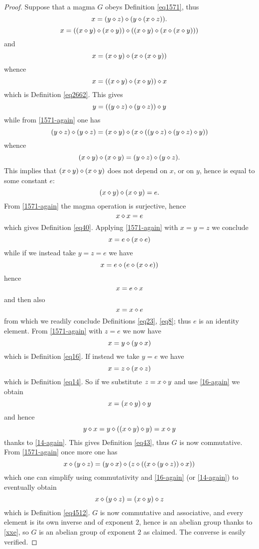 \begin{proof}\leanok  Suppose that a magma $G$ obeys Definition \ref{eq1571}, thus
\begin{equation}\label{1571-again}
 x = (y \diamond z) \diamond (y \diamond (x \diamond z)).
\end{equation}
$$ x = ((x \diamond y) \diamond (x \diamond y)) \diamond ((x \diamond y) \diamond (x \diamond (x \diamond y)))$$
and
$$ x = (x \diamond y) \diamond (x \diamond (x \diamond y))$$
whence
$$x = ((x \diamond y) \diamond (x \diamond y)) \diamond x$$
which is Definition \ref{eq2662}.  This gives
$$y = ((y \diamond z) \diamond (y \diamond z)) \diamond y$$
while from \eqref{1571-again} one has
$$ (y \diamond z) \diamond (y \diamond z) = (x \diamond y) \diamond (x \diamond ((y \diamond z) \diamond (y \diamond z) \diamond y))$$
whence
$$ (x \diamond y) \diamond (x \diamond y) = (y \diamond z) \diamond (y \diamond z).$$
This implies that $(x \diamond y) \diamond (x \diamond y)$ does not depend on $x$, or on $y$, hence is equal to some constant $e$:
$$ (x \diamond y) \diamond (x \diamond y) = e.$$
From \eqref{1571-again} the magma operation is surjective, hence
\begin{equation}\label{xxe} x \diamond x = e
\end{equation}
which gives Definition \ref{eq40}.  Applying \eqref{1571-again} with $x=y=z$ we conclude
$$ x = e \diamond (x \diamond e)$$
while if we instead take $y=z=e$ we have
$$ x = e \diamond (e \diamond (x \diamond e))$$
hence
$$ x = e \diamond x$$
and then also
$$ x = x \diamond e$$
from which we readily conclude Definitions \ref{eq23}, \ref{eq8}; thus $e$ is an identity element.  From \eqref{1571-again} with $z=e$ we now have
\begin{equation}\label{16-again}
 x = y \diamond (y \diamond x)
\end{equation}
which is Definition \ref{eq16}. If instead we take $y=e$ we have
\begin{equation}\label{14-again}
  x = z \diamond (x \diamond z)
\end{equation}
which is Definition \ref{eq14}.  So if we substitute $z = x \diamond y$ and use \eqref{16-again} we obtain
$$ x = (x \diamond y) \diamond y$$
and hence
$$ y \diamond x = y \diamond ((x \diamond y) \diamond y) = x \diamond y$$
thanks to \eqref{14-again}.  This gives Definition \ref{eq43}, thus $G$ is now commutative.  From \eqref{1571-again} once more one has
$$x \diamond (y \diamond z) = (y \diamond x) \diamond (z \diamond ((x \diamond (y \diamond z)) \diamond x))$$
which one can simplify using commutativity and \eqref{16-again} (or \eqref{14-again}) to eventually obtain
$$x \diamond (y \diamond z) = (x \diamond y) \diamond z$$
which is Definition \ref{eq4512}.  $G$ is now commutative and associative, and every element is its own inverse and of exponent $2$, hence is an abelian group thanks to \eqref{xxe}, so $G$ is an abelian group of exponent $2$ as claimed.  The converse is easily verified.
\end{proof}

